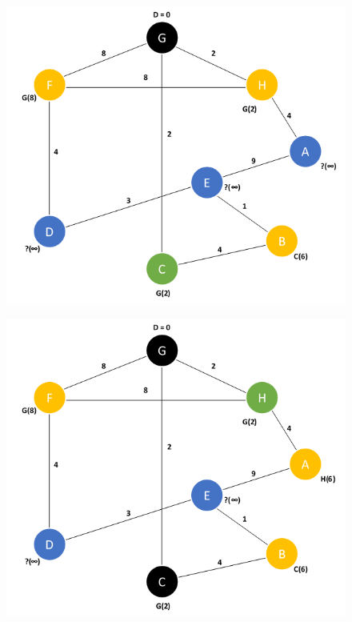 \documentclass{article}
\begin{document}
\begin{figure}[H]
\centering
\includegraphics[scale=0.6]{images/Q1/02.png}
\end{figure}

\begin{figure}[H]
\centering
\includegraphics[scale=0.6]{images/Q1/03.png}
\end{figure}
\end{document}
